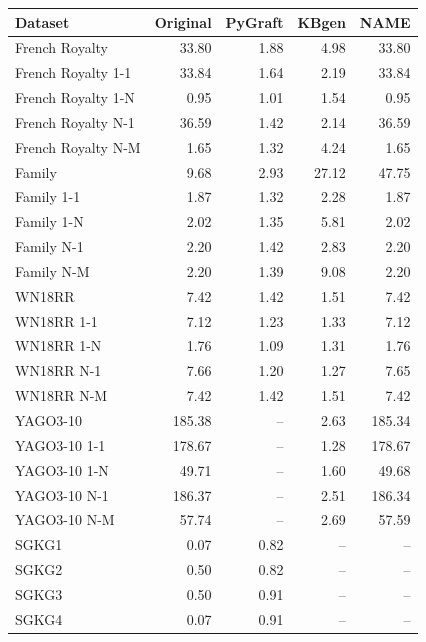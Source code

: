 \begin{tabular}{lrrrr}
\toprule
Dataset & Original & PyGraft & KBgen & NAME \\
\midrule
French Royalty & 33.80 & 1.88 & 4.98 & 33.80 \\
French Royalty 1-1 & 33.84 & 1.64 & 2.19 & 33.84 \\
French Royalty 1-N & 0.95 & 1.01 & 1.54 & 0.95 \\
French Royalty N-1 & 36.59 & 1.42 & 2.14 & 36.59 \\
French Royalty N-M & 1.65 & 1.32 & 4.24 & 1.65 \\
\midrule
Family & 9.68 & 2.93 & 27.12 & 47.75 \\
Family 1-1 & 1.87 & 1.32 & 2.28 & 1.87 \\
Family 1-N & 2.02 & 1.35 & 5.81 & 2.02 \\
Family N-1 & 2.20 & 1.42 & 2.83 & 2.20 \\
Family N-M & 2.20 & 1.39 & 9.08 & 2.20 \\
\midrule
WN18RR & 7.42 & 1.42 & 1.51 & 7.42 \\
WN18RR 1-1 & 7.12 & 1.23 & 1.33 & 7.12 \\
WN18RR 1-N & 1.76 & 1.09 & 1.31 & 1.76 \\
WN18RR N-1 & 7.66 & 1.20 & 1.27 & 7.65 \\
WN18RR N-M & 7.42 & 1.42 & 1.51 & 7.42 \\
\midrule
YAGO3-10 & 185.38 & – & 2.63 & 185.34 \\
YAGO3-10 1-1 & 178.67 & – & 1.28 & 178.67 \\
YAGO3-10 1-N & 49.71 & – & 1.60 & 49.68 \\
YAGO3-10 N-1 & 186.37 & – & 2.51 & 186.34 \\
YAGO3-10 N-M & 57.74 & – & 2.69 & 57.59 \\
\midrule
SGKG1 & 0.07 & 0.82 & – & – \\
SGKG2 & 0.50 & 0.82 & – & – \\
SGKG3 & 0.50 & 0.91 & – & – \\
SGKG4 & 0.07 & 0.91 & – & – \\
\bottomrule
\end{tabular}
